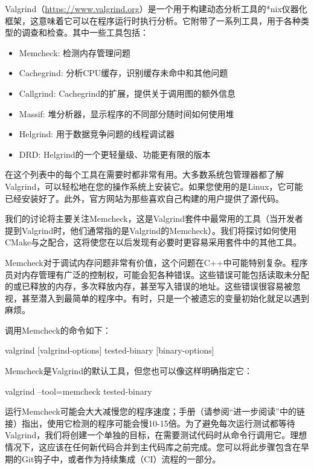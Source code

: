 
Valgrind（\url{https://www.valgrind.org}）是一个用于构建动态分析工具的*nix仪器化框架，这意味着它可以在程序运行时执行分析。它附带了一系列工具，用于各种类型的调查和检查。其中一些工具包括：

\begin{itemize}
\item
Memcheck: 检测内存管理问题

\item
Cachegrind: 分析CPU缓存，识别缓存未命中和其他问题

\item
Callgrind: Cachegrind的扩展，提供关于调用图的额外信息

\item
Massif: 堆分析器，显示程序的不同部分随时间如何使用堆

\item
Helgrind: 用于数据竞争问题的线程调试器

\item
DRD: Helgrind的一个更轻量级、功能更有限的版本
\end{itemize}

在这个列表中的每个工具在需要时都非常有用。大多数系统包管理器都了解Valgrind，可以轻松地在您的操作系统上安装它。如果您使用的是Linux，它可能已经安装好了。此外，官方网站为那些喜欢自己构建的用户提供了源代码。

我们的讨论将主要关注Memcheck，这是Valgrind套件中最常用的工具（当开发者提到Valgrind时，他们通常指的是Valgrind的Memcheck）。我们将探讨如何使用CMake与之配合，这将使您在以后发现有必要时更容易采用套件中的其他工具。


Memcheck对于调试内存问题非常有价值，这个问题在C++中可能特别复杂。程序员对内存管理有广泛的控制权，可能会犯各种错误。这些错误可能包括读取未分配的或已释放的内存，多次释放内存，甚至写入错误的地址。这些错误很容易被忽视，甚至潜入到最简单的程序中。有时，只是一个被遗忘的变量初始化就足以遇到麻烦。

调用Memcheck的命令如下：

\begin{shell}
valgrind [valgrind-options] tested-binary [binary-options]
\end{shell}

Memcheck是Valgrind的默认工具，但您也可以像这样明确指定它：

\begin{shell}
valgrind --tool=memcheck tested-binary
\end{shell}

运行Memcheck可能会大大减慢您的程序速度；手册（请参阅“进一步阅读”中的链接）指出，使用它检测的程序可能会慢10-15倍。为了避免每次运行测试都等待Valgrind，我们将创建一个单独的目标，在需要测试代码时从命令行调用它。理想情况下，这应该在任何新代码合并到主代码库之前完成。您可以将此步骤包含在早期的Git钩子中，或者作为持续集成（CI）流程的一部分。

